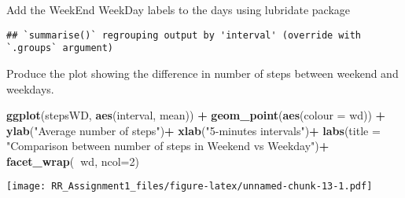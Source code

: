 \documentclass[]{article}
\newenvironment{Shaded}{\begin{snugshade}}{\end{snugshade}}
\newcommand{\DataTypeTok}[1]{\textcolor[rgb]{0.13,0.29,0.53}{#1}}
\newcommand{\DecValTok}[1]{\textcolor[rgb]{0.00,0.00,0.81}{#1}}
\newcommand{\KeywordTok}[1]{\textcolor[rgb]{0.13,0.29,0.53}{\textbf{#1}}}
\newcommand{\NormalTok}[1]{#1}
\newcommand{\OperatorTok}[1]{\textcolor[rgb]{0.81,0.36,0.00}{\textbf{#1}}}
\newcommand{\OtherTok}[1]{\textcolor[rgb]{0.56,0.35,0.01}{#1}}
\newcommand{\StringTok}[1]{\textcolor[rgb]{0.31,0.60,0.02}{#1}}
\begin{document}
Add the WeekEnd WeekDay labels to the days using lubridate package

\begin{Shaded}
\end{Shaded}

\begin{verbatim}
## `summarise()` regrouping output by 'interval' (override with `.groups` argument)
\end{verbatim}

\begin{Shaded}
\end{Shaded}

Produce the plot showing the difference in number of steps between
weekend and weekdays.

\begin{Shaded}
\begin{Highlighting}[]
\KeywordTok{ggplot}\NormalTok{(stepsWD, }\KeywordTok{aes}\NormalTok{(interval, mean)) }\OperatorTok{+}
\StringTok{        }\KeywordTok{geom_point}\NormalTok{(}\KeywordTok{aes}\NormalTok{(}\DataTypeTok{colour =}\NormalTok{ wd)) }\OperatorTok{+}
\StringTok{        }\KeywordTok{ylab}\NormalTok{(}\StringTok{"Average number of steps"}\NormalTok{)}\OperatorTok{+}
\StringTok{        }\KeywordTok{xlab}\NormalTok{(}\StringTok{"5-minutes intervals"}\NormalTok{)}\OperatorTok{+}
\StringTok{        }\KeywordTok{labs}\NormalTok{(}\DataTypeTok{title =} \StringTok{"Comparison between number of steps in Weekend vs Weekday"}\NormalTok{)}\OperatorTok{+}
\StringTok{        }\KeywordTok{facet_wrap}\NormalTok{(}\OperatorTok{~}\NormalTok{wd, }\DataTypeTok{ncol=}\DecValTok{2}\NormalTok{)}
\end{Highlighting}
\end{Shaded}

\texttt{[image: RR\_Assignment1\_files/figure-latex/unnamed-chunk-13-1.pdf]}
\end{document}
